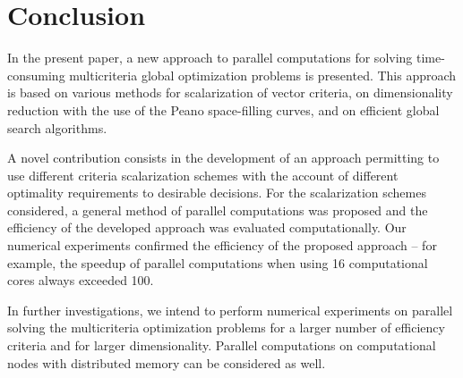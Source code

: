 \documentclass[runningheads]{llncs}
\begin{document}
\section{Conclusion}
In the present paper, a new approach to parallel computations for solving time-consuming multicriteria global optimization problems is presented. This approach is based on various methods for scalarization of vector criteria, on dimensionality reduction with the use of the Peano space-filling curves, and on efficient global search algorithms. 

A novel contribution consists in the development of an approach permitting to use different criteria scalarization schemes with the account of different optimality requirements to desirable decisions. For the scalarization schemes considered, a general method of parallel computations was proposed and the efficiency of the developed approach was evaluated computationally. Our numerical experiments confirmed the efficiency of the proposed approach -- for example, the speedup of parallel computations when using 16 computational cores always exceeded 100.

In further investigations, we intend to perform numerical experiments on parallel solving the multicriteria optimization problems for a larger number of efficiency criteria and for larger dimensionality. Parallel computations on computational nodes with distributed memory can be considered as well.
\end{document}
